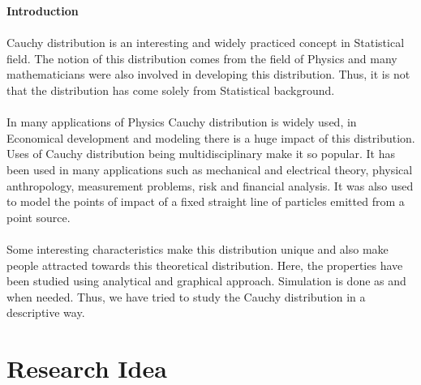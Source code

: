 \documentclass[12pt, fleqn, a4paper]{article}
\begin{document}
	\begin{spacing}{2}
		\tableofcontents \newpage
		\listoffigures
		\lstlistoflistings
	\end{spacing}

	\newpage 
	\setcounter{page}{1}
	
	\centering \null \vfill
	\textbf{\LARGE Introduction} \\ \justifying
	\paragraph{} Cauchy distribution is an interesting and widely practiced concept in Statistical field. The notion of this distribution comes from the field of Physics and many mathematicians were also involved in developing this distribution. Thus, it is not that the distribution has come solely from Statistical background. 
	\paragraph{} In many applications of Physics Cauchy distribution is widely used, in Economical development and modeling there is a huge impact of this distribution. Uses of Cauchy distribution being multidisciplinary make it so popular. It has been used in many applications such as mechanical and electrical theory, physical anthropology, measurement problems, risk and financial analysis. It was also used to model the points of impact of a fixed straight line of particles emitted from a point source.
	\paragraph{} Some interesting characteristics make this distribution unique and also make people attracted towards this theoretical distribution. Here, the properties have been studied using analytical and graphical approach. Simulation is done as and when needed. Thus, we have tried to study the Cauchy distribution in a descriptive way. 
	\vfill \null 
	\paragraph{} 
	
	\newpage
	\section{Research Idea}
\end{document}
